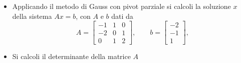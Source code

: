 \begin{itemize}
\item Applicando il metodo di Gauss con pivot parziale si calcoli la soluzione $x$ della sistema $Ax=b$, con $A$ e $b$
dati da
\bigskip
\[
A=\left[
\begin{array}{ccc}
-1 & 1 & 0 \\
-2 & 0 & 1\\
0 & 1 & 2
\end{array}\right],\quad \quad
b=\left[
\begin{array}{c}
  -2\\
   -1 \\
   1
\end{array}\right],
\]
\item Si calcoli il determinante della matrice $A$
\end{itemize}
